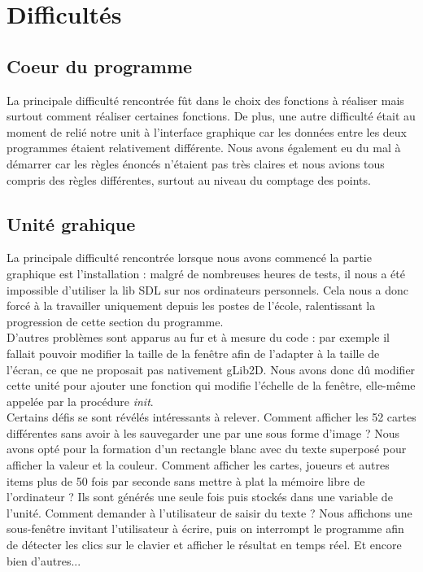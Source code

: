 \documentclass[12pt]{report}
\begin{document}
\section{Difficultés}
	\subsection{Coeur du programme}
	La principale difficulté rencontrée fût dans le choix des fonctions à réaliser mais surtout comment réaliser certaines fonctions. De plus, une autre difficulté était au moment de relié notre unit à l'interface graphique car les données entre les deux programmes étaient relativement différente. Nous avons également eu du mal à démarrer car les règles énoncés n'étaient pas très claires et nous avions tous compris des règles différentes, surtout au niveau du comptage des points.
	
	\subsection{Unité grahique}
	La principale difficulté rencontrée lorsque nous avons commencé la partie graphique est l'installation : malgré de nombreuses heures de tests, il nous a été impossible d'utiliser la lib SDL sur nos ordinateurs personnels. Cela nous a donc forcé à la travailler uniquement depuis les postes de l'école, ralentissant la progression de cette section du programme.\\ 
	
	D'autres problèmes sont apparus au fur et à mesure du code : par exemple il fallait pouvoir modifier la taille de la fenêtre afin de l'adapter à la taille de l'écran, ce que ne proposait pas nativement gLib2D. Nous avons donc dû modifier cette unité pour ajouter une fonction qui modifie l'échelle de la fenêtre, elle-même appelée par la procédure \textit{init}. \\
	\clearpage
	Certains défis se sont révélés intéressants à relever. Comment afficher les 52 cartes différentes sans avoir à les sauvegarder une par une sous forme d'image ? Nous avons opté pour la formation d'un rectangle blanc avec du texte superposé pour afficher la valeur et la couleur. Comment afficher les cartes, joueurs et autres items plus de 50 fois par seconde sans mettre à plat la mémoire libre de l'ordinateur ? Ils sont générés une seule fois puis stockés dans une variable de l'unité. Comment demander à l'utilisateur de saisir du texte ? Nous affichons une sous-fenêtre invitant l'utilisateur à écrire, puis on interrompt le programme afin de détecter les clics sur le clavier et afficher le résultat en temps réel. Et encore bien d'autres...
\end{document}
